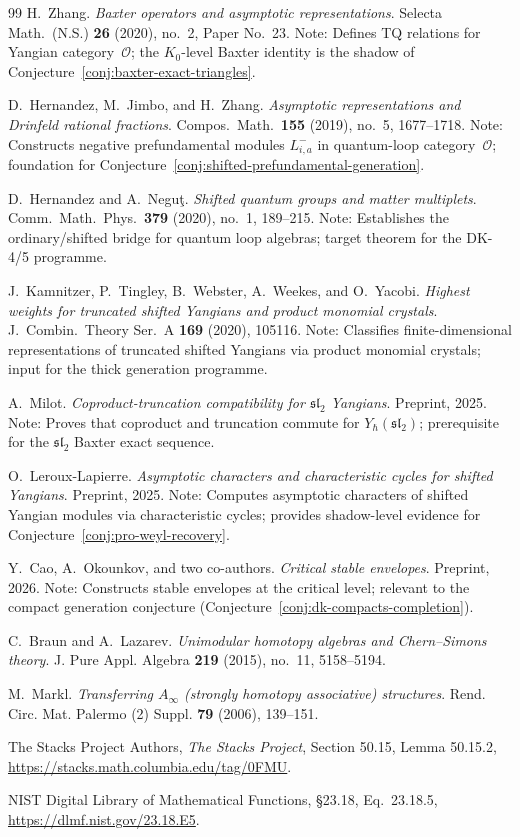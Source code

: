 \begin{thebibliography}{99}
H.~Zhang.
\textit{Baxter operators and asymptotic representations}.
Selecta Math.\ (N.S.) \textbf{26} (2020), no.~2, Paper No.~23.
Note: Defines TQ relations for Yangian category~$\mathcal{O}$;
the $K_0$-level Baxter identity is the shadow of
Conjecture~\ref{conj:baxter-exact-triangles}.

D.~Hernandez, M.~Jimbo, and H.~Zhang.
\textit{Asymptotic representations and Drinfeld rational fractions}.
Compos.\ Math.\ \textbf{155} (2019), no.~5, 1677--1718.
Note: Constructs negative prefundamental modules $L^-_{i,a}$ in
quantum-loop category~$\mathcal{O}$; foundation for
Conjecture~\ref{conj:shifted-prefundamental-generation}.

D.~Hernandez and A.~Negu\c{t}.
\textit{Shifted quantum groups and matter multiplets}.
Comm.\ Math.\ Phys.\ \textbf{379} (2020), no.~1, 189--215.
Note: Establishes the ordinary/shifted bridge for quantum loop algebras;
target theorem for the DK-4/5 programme.

J.~Kamnitzer, P.~Tingley, B.~Webster, A.~Weekes, and O.~Yacobi.
\textit{Highest weights for truncated shifted Yangians and product
monomial crystals}.
J.~Combin.\ Theory Ser.~A \textbf{169} (2020), 105116.
Note: Classifies finite-dimensional representations of truncated
shifted Yangians via product monomial crystals; input for the
thick generation programme.

A.~Milot.
\textit{Coproduct-truncation compatibility for $\mathfrak{sl}_2$ Yangians}.
Preprint, 2025.
Note: Proves that coproduct and truncation commute for
$Y_\hbar(\mathfrak{sl}_2)$; prerequisite for the $\mathfrak{sl}_2$
Baxter exact sequence.

O.~Leroux-Lapierre.
\textit{Asymptotic characters and characteristic cycles for
shifted Yangians}.
Preprint, 2025.
Note: Computes asymptotic characters of shifted Yangian modules
via characteristic cycles; provides shadow-level evidence for
Conjecture~\ref{conj:pro-weyl-recovery}.

Y.~Cao, A.~Okounkov, and two co-authors.
\textit{Critical stable envelopes}.
Preprint, 2026.
Note: Constructs stable envelopes at the critical level; relevant
to the compact generation conjecture
(Conjecture~\ref{conj:dk-compacts-completion}).

C.~Braun and A.~Lazarev.
\textit{Unimodular homotopy algebras and Chern--Simons theory}.
J. Pure Appl. Algebra \textbf{219} (2015), no.~11, 5158--5194.

M.~Markl.
\textit{Transferring $A_\infty$ (strongly homotopy associative)
structures}.
Rend. Circ. Mat. Palermo (2) Suppl. \textbf{79} (2006), 139--151.

The Stacks Project Authors, \emph{The Stacks Project},
Section 50.15, Lemma 50.15.2,
\url{https://stacks.math.columbia.edu/tag/0FMU}.

 NIST Digital Library of Mathematical Functions, \S23.18, Eq.~23.18.5, \url{https://dlmf.nist.gov/23.18.E5}.
\end{thebibliography}
